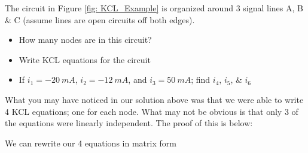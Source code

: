 \documentclass{handout}
\begin{document}
The circuit in Figure \ref{fig: KCL_Example} is organized around 3 signal lines A, B \& C (assume lines are open circuits off both edges). 
\begin{itemize}
\item How many nodes are in this circuit?
\item Write KCL equations for the circuit
\item If $i_1 = -20\ mA$, $i_2 = -12\ mA$, and $i_3 = 50\ mA$; find $i_4$, $i_5$, \& $i_6$
\end{itemize}


What you may have noticed in our solution above was that we were able to write 4 KCL equations; one for each node.  What may not be obvious is that only 3 of the equations were linearly independent.  The proof of this is below:


We can rewrite our 4 equations in matrix form
\end{document}
